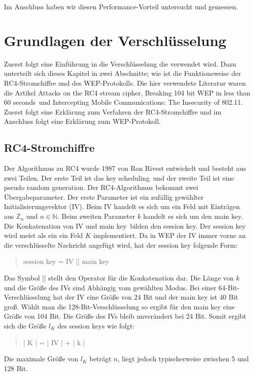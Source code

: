 \documentclass[10pt,a4paper]{article}
\begin{document}
Im Anschluss haben wir diesen Performance-Vorteil untersucht und gemessen.

\section{Grundlagen der Verschlüsselung}
Zuerst folgt eine Einführung in die Verschlüsselung die verwendet wird. Dazu unterteilt sich dieses Kapitel in zwei Abschnitte; wie ist die Funktionsweise der RC4-Stromchiffre und des WEP-Protokolls. Die hier verwendete Literatur waren die Artikel \glqq Attacks on the RC4 stream cipher\grqq \cite{Kle08}, \glqq Breaking 104 bit WEP in less than 60 seconds\grqq \cite{TWP07}\ und \glqq Intercepting Mobile Communications: The Insecurity of 802.11\grqq \cite{BGW01}. Zuerst folgt eine Erklärung zum Verfahren der RC4-Stromchiffre und im Anschluss folgt eine Erklärung zum WEP-Protokoll.

\subsection{RC4-Stromchiffre}
Der Algorithmus zu RC4 wurde 1987 von Ron Rivest entwickelt und besteht aus zwei Teilen. Der erste Teil ist das \glqq key scheduling\grqq \ und der zweite Teil ist eine \glqq pseudo random generation\grqq. Der RC4-Algorithmus bekommt zwei Übergabeparameter. Der erste Parameter ist ein zufällig gewählter Initialisierungsvektor (IV). Beim IV handelt es sich um ein Feld mit Einträgen aus $\mathbb{Z}_n$ und $n \in \mathbb{N}$. Beim zweiten Parameter $k$ handelt es sich um den \glqq main key\grqq. Die Konkatenation von IV und \glqq main key\grqq \ bilden den session key. Der session key wird meist als ein ein Feld $K$ implementiert. Da in WEP der IV immer vorne an die verschlüsselte Nachricht angefügt wird, hat der session key folgende Form:
\begin{quote}
	session key = IV || main key
\end{quote}
Das Symbol || stellt den Operator für die Konkatenation dar. Die Länge von $k$ und die Größe des IVs sind Abhängig vom gewählten Modus. Bei einer 64-Bit-Verschlüsselung hat der IV eine Größe von 24 Bit und der main key ist 40 Bit groß. Wählt man die 128-Bit-Verschlüsselung so ergibt für den main key eine Größe von 104 Bit. Die Größe des IVs bleib unverändert bei 24 Bit. Somit ergibt sich die Größe $l_K$ des session keys wie folgt:
\begin{quote}
	| K | = | IV | + | k |
\end{quote}
Die maximale Größe von $l_K$ beträgt $n$, liegt jedoch typischerweise zwischen 5 und 128 Bit.
\end{document}
